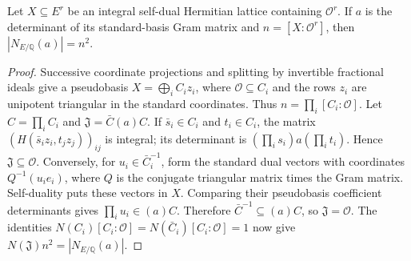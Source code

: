 \begin{lemma}\label{lem:gram-index}
Let $X\subseteq E^r$ be an integral self-dual Hermitian lattice containing
$\mathcal O^r$. If $a$ is the determinant of its standard-basis Gram matrix
and $n=[X:\mathcal O^r]$, then $|N_{E/\mathbb Q}(a)|=n^2$.
\end{lemma}
\begin{proof}
Successive coordinate projections and splitting by invertible fractional ideals
give a pseudobasis $X=\bigoplus_iC_i z_i$, where $\mathcal O\subseteq C_i$
and the rows $z_i$ are unipotent triangular in the standard coordinates. Thus
$n=\prod_i[C_i:\mathcal O]$. Let $C=\prod_iC_i$ and
$\mathfrak J=\bar C(a)C$. If $\bar s_i\in C_i$ and $t_i\in C_i$, the matrix
$(H(\bar s_i z_i,t_jz_j))_{ij}$ is integral; its determinant is
$(\prod_i s_i)a(\prod_it_i)$. Hence $\mathfrak J\subseteq\mathcal O$.
Conversely, for $u_i\in\bar C_i^{-1}$, form the standard dual vectors with
coordinates $Q^{-1}(u_ie_i)$, where $Q$ is the conjugate triangular matrix
times the Gram matrix. Self-duality puts these vectors in $X$. Comparing their
pseudobasis coefficient determinants gives $\prod_i u_i\in(a)C$. Therefore
$\bar C^{-1}\subseteq(a)C$, so $\mathfrak J=\mathcal O$. The identities
$N(C_i)[C_i:\mathcal O]=N(\bar C_i)[C_i:\mathcal O]=1$ now give
$N(\mathfrak J)n^2=|N_{E/\mathbb Q}(a)|$.
\end{proof}

